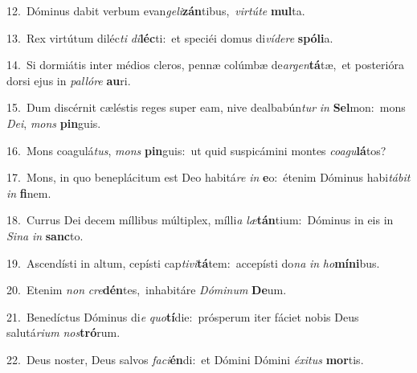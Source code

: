 {\numbfont\textcolor{\numbcolor}{12.}}~Dóminus dabit verbum evan\-\textit{ge}\-\textit{li}\textbf{zán}tibus,~\star \textit{vir}\-\textit{tú}\textit{te} \textbf{mul}\-ta.\par
{\numbfont\textcolor{\numbcolor}{13.}}~Rex virtútum diléc\textit{ti} \textit{di}\-\textbf{léc}ti:~\star et speciéi domus di\-\textit{ví}\-\textit{de}\textit{re} \textbf{spó}\-\textbf{li}a.\par
{\numbfont\textcolor{\numbcolor}{14.}}~Si dormiátis inter médios cleros, pennæ colúmbæ de\-\textit{ar}\-\textit{gen}\textbf{tá}tæ,~\star et posterióra dorsi ejus in \textit{pal}\-\textit{ló}\textit{re} \textbf{au}\-ri.\par
{\numbfont\textcolor{\numbcolor}{15.}}~Dum discérnit cæléstis reges super eam, nive dealbabún\textit{tur} \textit{in} \textbf{Sel}\-mon:~\star mons \textit{De}\-\textit{i}, \textit{mons} \textbf{pin}\-guis.\par
{\numbfont\textcolor{\numbcolor}{16.}}~Mons coagulá\-\textit{tus}\-, \textit{mons} \textbf{pin}\-guis:~\star ut quid suspicámini montes \textit{co}\-\textit{a}\textit{gu}\textbf{lá}tos?\par
{\numbfont\textcolor{\numbcolor}{17.}}~Mons, in quo beneplácitum est Deo habitá\textit{re} \textit{in} \textbf{e}\-o:~\star étenim Dóminus habi\-\textit{tá}\-\textit{bit} \textit{in} \textbf{fi}\-nem.\par
{\numbfont\textcolor{\numbcolor}{18.}}~Currus Dei decem míllibus múltiplex, mílli\textit{a} \textit{læ}\-\textbf{tán}tium:~\star Dóminus in eis in \textit{Si}\-\textit{na} \textit{in} \textbf{sanc}\-to.\par
{\numbfont\textcolor{\numbcolor}{19.}}~Ascendísti in altum, cepísti cap\-\textit{ti}\-\textit{vi}\textbf{tá}tem:~\star accepísti do\textit{na} \textit{in} \textit{ho}\-\textbf{mí}\textbf{ni}bus.\par
{\numbfont\textcolor{\numbcolor}{20.}}~Etenim \textit{non} \textit{cre}\-\textbf{dén}tes,~\star inhabitáre \textit{Dó}\-\textit{mi}\textit{num} \textbf{De}\-um.\par
{\numbfont\textcolor{\numbcolor}{21.}}~Benedíctus Dóminus di\textit{e} \textit{quo}\-\textbf{tí}die:~\star prósperum iter fáciet nobis Deus salutá\-\textit{ri}\-\textit{um} \textit{nos}\-\textbf{tró}rum.\par
{\numbfont\textcolor{\numbcolor}{22.}}~Deus noster, Deus salvos \textit{fa}\-\textit{ci}\textbf{én}di:~\star et Dómini Dómini \textit{éx}\-\textit{i}\textit{tus} \textbf{mor}\-tis.\par
